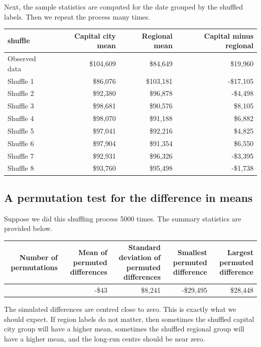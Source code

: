 \documentclass[
  letterpaper,
  DIV=11,
  numbers=noendperiod]{scrreprt}
\begin{document}
Next, the sample statistics are computed for the date grouped by the
shuffled labels. Then we repeat the process many times.

\begin{table}
\fontsize{12.0pt}{14.0pt}\selectfont
\begin{tabular*}{\linewidth}{@{\extracolsep{\fill}}lrrr}
\toprule
shuffle & Capital city mean & Regional mean & Capital minus regional \\ 
\midrule\addlinespace[2.5pt]
Observed data & \$104,609 & \$84,649 & \$19,960 \\ 
Shuffle 1 & \$86,076 & \$103,181 & -\$17,105 \\ 
Shuffle 2 & \$92,380 & \$96,878 & -\$4,498 \\ 
Shuffle 3 & \$98,681 & \$90,576 & \$8,105 \\ 
Shuffle 4 & \$98,070 & \$91,188 & \$6,882 \\ 
Shuffle 5 & \$97,041 & \$92,216 & \$4,825 \\ 
Shuffle 6 & \$97,904 & \$91,354 & \$6,550 \\ 
Shuffle 7 & \$92,931 & \$96,326 & -\$3,395 \\ 
Shuffle 8 & \$93,760 & \$95,498 & -\$1,738 \\ 
\bottomrule
\end{tabular*}
\end{table}

\subsection{A permutation test for the difference in
means}\label{a-permutation-test-for-the-difference-in-means}

Suppose we did this shuffling process 5000 times. The summary statistics
are provided below.

\begin{table}
\fontsize{12.0pt}{14.0pt}\selectfont
\begin{tabular*}{\linewidth}{@{\extracolsep{\fill}}rrrrr}
\toprule
Number of permutations & Mean of permuted differences & Standard deviation of permuted differences & Smallest permuted difference & Largest permuted difference \\ 
\midrule\addlinespace[2.5pt]
5000 & -\$43 & \$8,241 & -\$29,495 & \$28,448 \\ 
\bottomrule
\end{tabular*}
\end{table}

The simulated differences are centred close to zero. This is exactly
what we should expect. If region labels do not matter, then sometimes
the shuffled capital city group will have a higher mean, sometimes the
shuffled regional group will have a higher mean, and the long-run centre
should be near zero.
\end{document}
